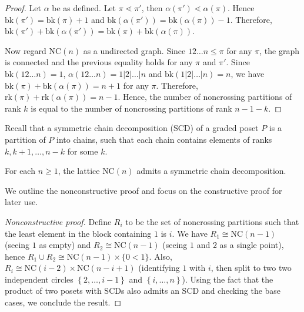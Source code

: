 \begin{proof}
  Let $\alpha$ be as defined. Let $\pi\lessdot \pi'$, then $\alpha(\pi')\lessdot \alpha(\pi)$.
  Hence $\text{bk}(\pi') = \text{bk}(\pi)+1$ and $\text{bk}(\alpha(\pi')) = \text{bk}(\alpha(\pi))-1$. Therefore, $\text{bk}(\pi') + \text{bk}(\alpha(\pi')) = \text{bk}(\pi) + \text{bk}(\alpha(\pi)).$

  Now regard $\text{NC}(n)$ as a undirected graph. Since $12\ldots n \le \pi$ for any $\pi$, the graph is connected and the previous equality holds for any $\pi$ and $\pi'$. Since $\text{bk}(12\ldots n) = 1$, $\alpha(12\ldots n) = 1|2|\ldots|n$ and $\text{bk}(1|2|\ldots|n) = n$, we have $\text{bk}(\pi) + \text{bk}(\alpha(\pi)) = n+1$ for any $\pi$. Therefore, $\text{rk}(\pi) + \text{rk}(\alpha(\pi)) = n-1$. Hence, the number of noncrossing partitions of rank $k$ is equal to the number of noncrossing partitions of rank $n-1-k$.
\end{proof}

Recall that a symmetric chain decomposition (SCD) of a graded poset $P$ is a partition of $P$ into chains, such that each chain contains elements of ranks $k, k+1, \dots, n-k$ for some $k$.

\begin{theorem}
  For each $n\ge 1$, the lattice $\text{NC}(n)$ admits a symmetric chain decomposition.
\end{theorem}

We outline the nonconstructive proof and focus on the constructive proof for later use.

\begin{proof}[Nonconstructive proof]
  Define $R_i$ to be the set of noncrossing partitions such that the least element in the block containing $1$ is $i$. We have $R_1\cong \text{NC}(n-1)$ (seeing $1$ as empty) and $R_2\cong \text{NC}(n-1)$ (seeing $1$ and $2$ as a single point), hence $R_1\cup R_2\cong \text{NC}(n-1)\times \{0 < 1\}$. Also, $R_i\cong \text{NC}(i-2)\times \text{NC}(n-i+1)$ (identifying $1$ with $i$, then split to two two independent circles $\left\{2,\ldots,i-1\right\}$ and $\left\{i,\ldots,n\right\}$). Using the fact that the product of two posets with SCDs also admits an SCD and checking the base cases, we conclude the result.
\end{proof}

